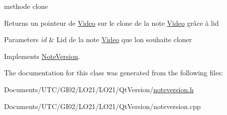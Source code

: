 methode clone 

\begin{DoxyReturn}{Returns}
un pointeur de \hyperlink{class_video}{Video} sur le clone de la note \hyperlink{class_video}{Video} grâce à l\textquotesingle{}id 
\end{DoxyReturn}

\begin{DoxyParams}{Parameters}
{\em id} & L\textquotesingle{}id de la note \hyperlink{class_video}{Video} que l\textquotesingle{}on souhaite cloner \\
\hline
\end{DoxyParams}


Implements \hyperlink{class_note_version_a7eb23a52291ec623b9bc1b6fe3e86c5a}{Note\+Version}.



The documentation for this class was generated from the following files\+:\begin{DoxyCompactItemize}
\item 
Documents/\+U\+T\+C/\+G\+I02/\+L\+O21/\+L\+O21/\+Qt\+Version/\hyperlink{noteversion_8h}{noteversion.\+h}\item 
Documents/\+U\+T\+C/\+G\+I02/\+L\+O21/\+L\+O21/\+Qt\+Version/noteversion.\+cpp\end{DoxyCompactItemize}

